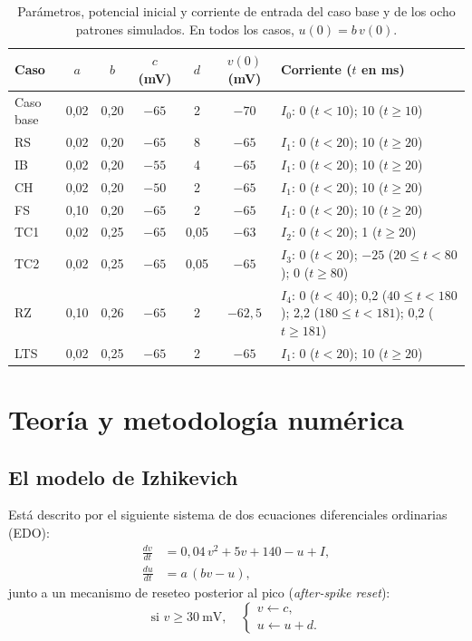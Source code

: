 \documentclass[10pt,a4paper,twocolumn]{article}
\begin{document}
\begin{table}[!t]
  \centering
  \caption{Parámetros, potencial inicial y corriente de entrada del caso base y de los
  ocho patrones simulados. En todos los casos, $u(0) = b\,v(0)$.}
  \label{tab:casos}
  \small\setlength{\tabcolsep}{4.5pt}
  \begin{tabular}{lcccccl}
    \toprule
    Caso & $a$ & $b$ & $c$ (mV) & $d$ & $v(0)$ (mV) & Corriente ($t$ en ms) \\
    \midrule
    Caso base & 0,02 & 0,20 & $-65$ & 2    & $-70$   & $I_0$: 0 ($t<10$); 10 ($t \geq 10$) \\
    RS        & 0,02 & 0,20 & $-65$ & 8    & $-65$   & $I_1$: 0 ($t<20$); 10 ($t \geq 20$) \\
    IB        & 0,02 & 0,20 & $-55$ & 4    & $-65$   & $I_1$: 0 ($t<20$); 10 ($t \geq 20$) \\
    CH        & 0,02 & 0,20 & $-50$ & 2    & $-65$   & $I_1$: 0 ($t<20$); 10 ($t \geq 20$) \\
    FS        & 0,10 & 0,20 & $-65$ & 2    & $-65$   & $I_1$: 0 ($t<20$); 10 ($t \geq 20$) \\
    TC1       & 0,02 & 0,25 & $-65$ & 0,05 & $-63$   & $I_2$: 0 ($t<20$); 1 ($t \geq 20$) \\
    TC2       & 0,02 & 0,25 & $-65$ & 0,05 & $-65$   & $I_3$: 0 ($t<20$); $-25$ ($20 \leq t < 80$); 0 ($t \geq 80$) \\
    RZ        & 0,10 & 0,26 & $-65$ & 2    & $-62,5$ & $I_4$: 0 ($t<40$); 0,2 ($40 \leq t < 180$); 2,2 ($180 \leq t < 181$); 0,2 ($t \geq 181$) \\
    LTS       & 0,02 & 0,25 & $-65$ & 2    & $-65$   & $I_1$: 0 ($t<20$); 10 ($t \geq 20$) \\
    \bottomrule
  \end{tabular}
\end{table}

\section{Teoría y metodología numérica}

\subsection*{El modelo de Izhikevich}

Está descrito por el siguiente sistema de dos ecuaciones diferenciales ordinarias
(EDO):
\begin{align}
  \frac{dv}{dt} &= 0,04\,v^{2} + 5v + 140 - u + I, \label{eq:v}\\
  \frac{du}{dt} &= a\,(bv - u), \label{eq:u}
\end{align}
junto a un mecanismo de reseteo posterior al pico (\emph{after-spike reset}):
\begin{equation}
  \text{si } v \geq 30~\text{mV}, \quad
  \begin{cases}
    v \leftarrow c,\\
    u \leftarrow u + d.
  \end{cases}
  \label{eq:reset}
\end{equation}
\end{document}

